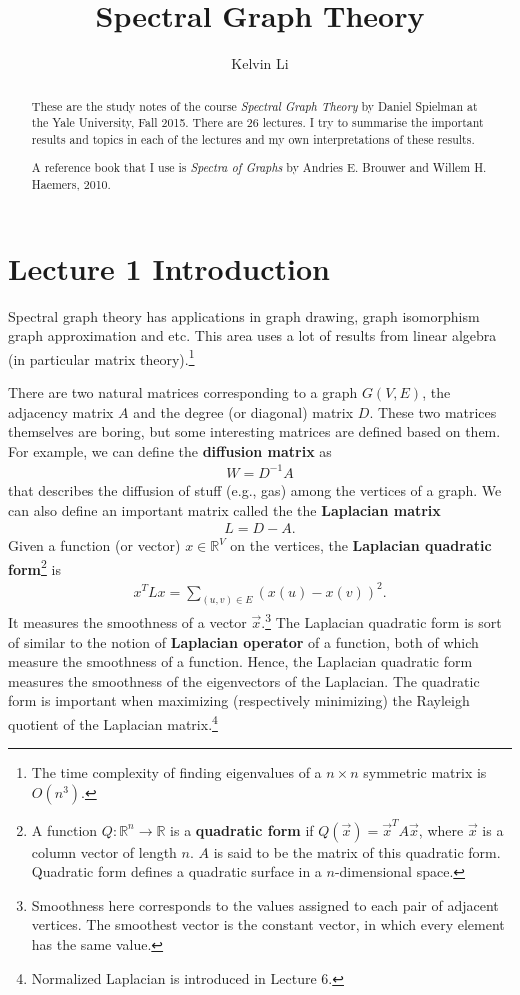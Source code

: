 \documentclass[]{article}
\title{Spectral Graph Theory}
\author{Kelvin Li}
\begin{document}
	
	\maketitle
	
	\begin{abstract}
		These are the study notes of the course \textit{Spectral Graph Theory} by Daniel Spielman at the Yale University, Fall 2015. There are 26 lectures. I try to summarise the important results and topics in each of the lectures and my own interpretations of these results. 
		
		A reference book that I use is \textit{Spectra of Graphs} by Andries E. Brouwer and Willem H. Haemers, 2010. 
	\end{abstract}
	
	\section{Lecture 1 Introduction}
	Spectral graph theory has applications in graph drawing, graph isomorphism graph approximation and etc. This area uses a lot of results from linear algebra (in particular matrix theory).\footnote{The time complexity of finding eigenvalues of a $n \times n$ symmetric matrix is $O(n^3)$.}
	
	There are two natural matrices corresponding to a graph $G(V,E)$, the adjacency matrix $A$ and the degree (or diagonal) matrix $D$. These two matrices themselves are boring, but some interesting matrices are defined based on them. For example, we can define the \textbf{diffusion matrix} as
	\begin{align*}
	W = D^{-1}A
	\end{align*} 
	that describes the diffusion of stuff (e.g., gas) among the vertices of a graph. We can also define an important matrix called the the \textbf{Laplacian matrix} 
	\begin{align*}
	L=D-A.
	\end{align*}
	Given a function (or vector) $x \in \mathbb{R}^V$ on the vertices, the \textbf{Laplacian quadratic form}\footnote{A function $Q: \mathbb{R}^n \rightarrow \mathbb{R}$ is a \textbf{quadratic form} if $Q(\vec{x}) = \vec{x}^T A \vec{x}$, where $\vec{x}$ is a column vector of length $n$. $A$ is said to be the matrix of this quadratic form. Quadratic form defines a quadratic surface in a $n$-dimensional space.} is 
	\begin{align*}
	x^T L x = \sum_{(u,v)\in E} (x(u) - x(v))^2.
	\end{align*}
	It measures the smoothness of a vector $\vec{x}$.\footnote{Smoothness here corresponds to the values assigned to each pair of adjacent vertices. The smoothest vector is the constant vector, in which every element has the same value.} The Laplacian quadratic form is sort of similar to the notion of \textbf{Laplacian operator} of a function, both of which measure the smoothness of a function. Hence, the Laplacian quadratic form measures the smoothness of the eigenvectors of the Laplacian. The quadratic form is important when maximizing (respectively minimizing) the Rayleigh quotient of the Laplacian matrix.\footnote{Normalized Laplacian is introduced in Lecture 6.}  
	
\end{document}
